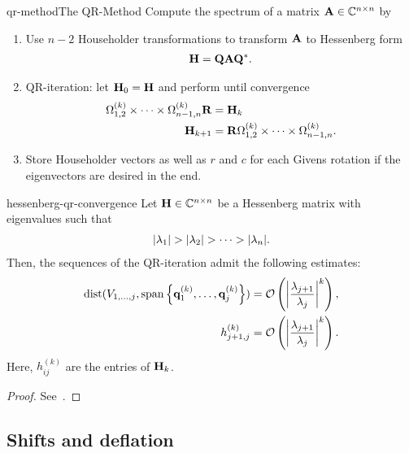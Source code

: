 \begin{Algorithm*}{qr-method}{The QR-Method}
  Compute the spectrum of a matrix $\mata\in\Cnn$ by
  \begin{enumerate}
  \item Use $n-2$ Householder transformations to transform $\mata$ to
    Hessenberg form
    \begin{gather}
     \matH = \matq\mata\matq^*.
   \end{gather}
 \item QR-iteration: let $\matH_{0}=\matH$ and perform until convergence
   \begin{align}
     \Omega^{(k)}_{1,2}\times\dots\times\Omega^{(k)}_{n-1,n} \matr &= \matH_k\\
     \matH_{k+1} &= \matr \Omega^{(k)}_{1,2}\times\dots\times\Omega^{(k)}_{n-1,n}.
   \end{align}
 \item Store Householder vectors as well as $r$ and $c$ for each
   Givens rotation if the eigenvectors are desired in the end.
  \end{enumerate}
\end{Algorithm*}

\begin{Theorem}{hessenberg-qr-convergence}
    Let $\matH\in\Cnn$ be a Hessenberg matrix with eigenvalues such that
  \begin{gather}
    \abs{\lambda_1} >
    \abs{\lambda_2}>\dots>\abs{\lambda_n}.
  \end{gather}
  Then, the sequences of the QR-iteration admit the following estimates:
  \begin{align}
    \dist(\esp{1,\dots,j},\spann{\vq_1^{(k)},\dots,\vq_j^{(k)}}) &= \bigo \left(\abs*{\frac{\lambda_{j+1}}{\lambda_j}}^k\right),
    \\
    h_{j+1,j}^{(k)} &= \bigo \left(\abs*{\frac{\lambda_{j+1}}{\lambda_j}}^k\right)
                      .
  \end{align}
  Here, $h_{ij}^{(k)}$ are the entries of $\matH_k$.
\end{Theorem}

\begin{proof}
  See~\cite[Theorem 7.3-1]{GolubVanLoan83}.
\end{proof}

\subsection{Shifts and deflation}

